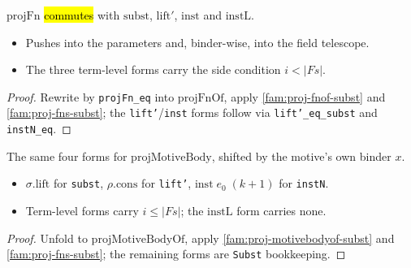 \begin{lemma}
  \label{fam:proj-fn-subst}
  \leanok

   $\mathrm{projFn}$ \hl{commutes} with $\mathrm{subst}$, $\mathrm{lift'}$,
  $\mathrm{inst}$ and $\mathrm{instL}$.
  \begin{itemize}
  \item Pushes into the parameters and, binder-wise, into the field telescope.
  \item The three term-level forms carry the side condition $i<|Fs|$.
  \end{itemize}
\end{lemma}
\begin{proof}
  \leanok
   Rewrite by \texttt{projFn\_eq} into $\mathrm{projFnOf}$, apply
  \ref{fam:proj-fnof-subst} and \ref{fam:proj-fns-subst}; the \texttt{lift'}/\texttt{inst} forms
  follow via \texttt{lift'\_eq\_subst} and \texttt{instN\_eq}.
\end{proof}

\begin{lemma}
  \label{fam:proj-motivebody-subst}
  \leanok

   The same four forms for $\mathrm{projMotiveBody}$, shifted by the motive's own
  binder $x$.
  \begin{itemize}
  \item $\sigma.\mathrm{lift}$ for \texttt{subst}, $\rho.\mathrm{cons}$ for \texttt{lift'},
        $\mathrm{inst}\;e_0\;(k+1)$ for \texttt{instN}.
  \item Term-level forms carry $i\le|Fs|$; the $\mathrm{instL}$ form carries none.
  \end{itemize}
\end{lemma}
\begin{proof}
  \leanok
   Unfold to $\mathrm{projMotiveBodyOf}$, apply \ref{fam:proj-motivebodyof-subst} and
  \ref{fam:proj-fns-subst}; the remaining forms are \texttt{Subst} bookkeeping.
\end{proof}

